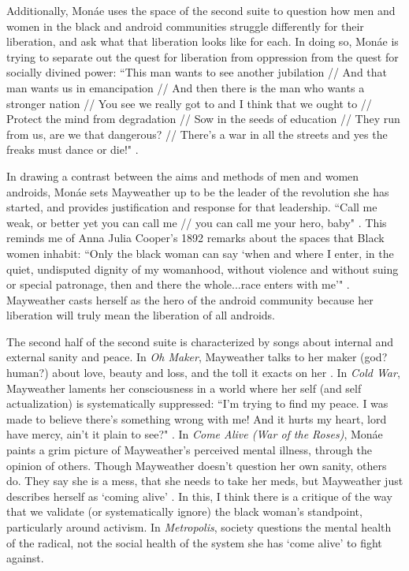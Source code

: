 \documentclass[a4paper, 11pt]{article} %
\begin{document}
Additionally, Mon\'ae uses the space of the second suite to question how men and women in the black and android communities struggle differently for their liberation, and ask what that liberation looks like for each.
In doing so, Mon\'ae is trying to separate out the quest for liberation from oppression from the quest for socially divined power:
``This man wants to see another jubilation //
And that man wants us in emancipation //
And then there is the man who wants a stronger nation //
You see we really got to and I think that we ought to //
Protect the mind from degradation //
Sow in the seeds of education //
They run from us, are we that dangerous? //
There's a war in all the streets and yes the freaks must dance or die!" \cite{danceordie}.

In drawing a contrast between the aims and methods of men and women androids, Mon\'ae sets Mayweather up to be the leader of the revolution she has started, and provides justification and response for that leadership.
``Call me weak, or better yet you can call me // you can call me your hero, baby" \cite{faster}.
This reminds me of Anna Julia Cooper's 1892 remarks about the spaces that Black women inhabit:
``Only the black woman can say `when and where I enter, in the quiet, undisputed dignity of my womanhood, without violence and without suing or special patronage, then and there the whole...race enters with me'" \cite{cooper1892}.
Mayweather casts herself as the hero of the android community because her liberation will truly mean the liberation of all androids.

The second half of the second suite is characterized by songs about internal and external sanity and peace.
In \emph{Oh Maker}, Mayweather talks to her maker (god? human?) about love, beauty and loss, and the toll it exacts on her \cite{ohmaker}.
In \emph{Cold War}, Mayweather laments her consciousness in a world where her self (and self actualization) is systematically suppressed:
``I'm trying to find my peace.  I was made to believe there's something wrong with me! And it hurts my heart, lord have mercy, ain't it plain to see?" \cite{coldwar}. 
In \emph{Come Alive (War of the Roses)}, Mon\'ae paints a grim picture of Mayweather's perceived mental illness, through the opinion of others.
Though Mayweather doesn't question her own sanity, others do.  
They say she is a mess, that she needs to take her meds, but Mayweather just describes herself as `coming alive' \cite{comealive}.
In this, I think there is a critique of the way that we validate (or systematically ignore) the black woman's standpoint, particularly around activism.
In \emph{Metropolis}, society questions the mental health of the radical, not the social health of the system she has `come alive' to fight against.
\end{document}
